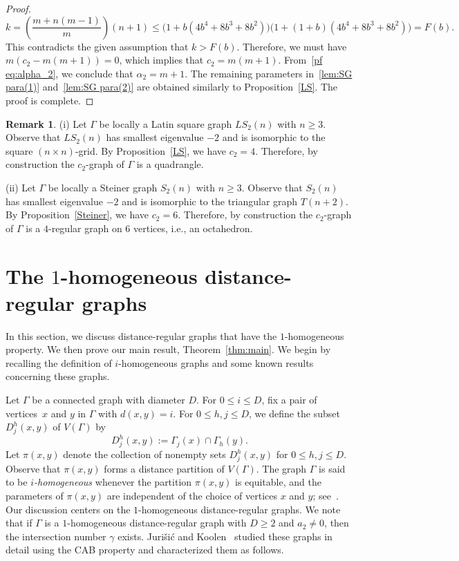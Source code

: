 \documentclass[11pt]{article}
\theoremstyle{definition}
\newtheorem{rema}[theo]{Remark}
\numberwithin{equation}{section}
\numberwithin{equation}{section}
\begin{document}
\begin{proof}
{\small \begin{equation}\label{pf eq(6):pf of SG}
	k = \left(\frac{m+n(m-1)}{m}\right)(n+1)\leqslant \big(1+b(4b^4 + 8b^3 + 8b^2)\big)\big(1+(1+b)(4b^4 + 8b^3 + 8b^2)\big) = F(b).
\end{equation}}This contradicts the given assumption that $k > F(b)$. 
Therefore, we must have \mbox{$m(c_2-m(m+1))=0$}, which implies that $c_2 = m(m+1)$.
From~\eqref{pf eq:alpha_2}, we conclude that $\alpha_2 = m+1$.
The remaining parameters in~\eqref{lem:SG para(1)} and~\eqref{lem:SG para(2)} are obtained similarly to Proposition~\ref{LS}. 
The proof is complete.
\end{proof}


\begin{rema}\label{rmk:Latin, Steiner}
(i) Let $\Gamma$ be locally a Latin square graph $LS_2(n)$ with $n \geqslant 3$.
Observe that $LS_2(n)$ has smallest eigenvalue $-2$ and is isomorphic to the square $(n \times n)$-grid.
By Proposition~\ref{LS}, we have $c_2 = 4$. 
Therefore, by construction the $c_2$-graph of $\Gamma$ is a quadrangle.

(ii) Let $\Gamma$ be locally a Steiner graph $S_2(n)$ with $n \geqslant 3$.
Observe that $S_2(n)$ has smallest eigenvalue $-2$ and is isomorphic to the triangular graph $T(n+2)$.
By Proposition~\ref{Steiner}, we have $c_2 = 6$.
Therefore, by construction the $c_2$-graph of $\Gamma$ is a $4$-regular graph on $6$ vertices, i.e., an octahedron.
\end{rema}

\section{The \texorpdfstring{$1$}{1}-homogeneous distance-regular graphs}\label{sec:1-homoDRGs}
In this section, we discuss distance-regular graphs that have the $1$-homogeneous property. 
We then prove our main result, Theorem~\ref{thm:main}.
We begin by recalling the definition of $i$-homogeneous graphs and some known results concerning these graphs.

Let $\Gamma$ be a connected graph with diameter $D$. 
For $0 \leqslant i \leqslant D$, fix a pair of vertices~$x$ and $y$ in $\Gamma$ with $d(x,y)=i$.
For $0 \leqslant h, j \leqslant D$, we define the subset $D^h_j(x, y)$ of $V(\Gamma)$ by
\begin{equation}
	D^h_j(x,y) := \Gamma_j(x) \cap \Gamma_h(y).
\end{equation}
Let $\pi(x,y)$ denote the collection of nonempty sets $D^h_j(x,y)$ for $0\leqslant h,j \leqslant D$.
Observe that $\pi(x,y)$ forms a distance partition of $V(\Gamma)$.
The graph $\Gamma$ is said to be \emph{$i$-homogeneous} whenever the partition $\pi(x,y)$ is equitable, and the parameters of $\pi(x,y)$ are independent of the choice of vertices $x$ and $y$; see~\cite{Nomura1994}.
Our discussion centers on the $1$-homogeneous distance-regular graphs.
We note that if $\Gamma$ is a $1$-homogeneous distance-regular graph with $D\geqslant 2$ and $a_2\neq 0$, then the intersection number $\gamma$ exists.
Juri\v si\' c and Koolen~\cite{JK2000-1} studied these graphs in detail using the CAB property and characterized them as follows.
\end{document}

